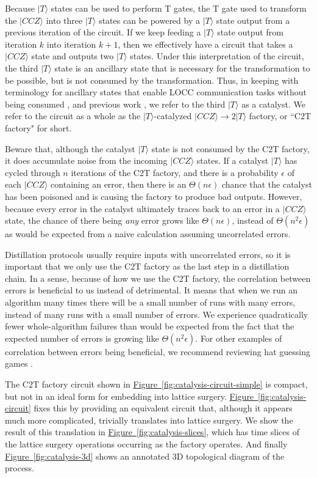 \documentclass[twocolumn,accepted=2019-03-30]{quantumarticle}
\newcommand{\fig}[1]{\hyperref[fig:#1]{Figure~\ref*{fig:#1}}}
\begin{document}
Because $|T\rangle$ states can be used to perform T gates, the T gate used to transform the $|CCZ\rangle$ into three $|T\rangle$ states can be powered by a $|T\rangle$ state output from a previous iteration of the circuit.
If we keep feeding a $|T\rangle$ state output from iteration $k$ into iteration $k+1$, then we effectively have a circuit that takes a $|CCZ\rangle$ state and outputs two $|T\rangle$ states.
Under this interpretation of the circuit, the third $|T\rangle$ state is an ancillary state that is necessary for the transformation to be possible, but is not consumed by the transformation.
Thus, in keeping with terminology for ancillary states that enable LOCC communication tasks without being consumed \cite{jonathan1999}, and previous work \cite{campbell2011catalysis}, we refer to the third $|T\rangle$ as a catalyst.
We refer to the circuit as a whole as the $|T\rangle$-catalyzed $|CCZ\rangle \rightarrow 2|T\rangle$ factory, or ``C2T factory" for short.

Beware that, although the catalyst $|T\rangle$ state is not consumed by the C2T factory, it does accumulate noise from the incoming $|CCZ\rangle$ states.
If a catalyst $|T\rangle$ has cycled through $n$ iterations of the C2T factory, and there is a probability $\epsilon$ of each $|CCZ\rangle$ containing an error, then there is an $\Theta(n \epsilon)$ chance that the catalyst has been poisoned and is causing the factory to produce bad outputs.
However, because every error in the catalyst ultimately traces back to an error in a $|CCZ\rangle$ state, the chance of there being {\em any} error grows like $\Theta(n \epsilon)$, instead of $\Theta(n^2 \epsilon)$ as would be expected from a naive calculation assuming uncorrelated errors.

Distillation protocols usually require inputs with uncorrelated errors, so it is important that we only use the C2T factory as the last step in a distillation chain.
In a sense, because of how we use the C2T factory, the correlation between errors is beneficial to us instead of detrimental.
It means that when we run an algorithm many times there will be a small number of runs with many errors, instead of many runs with a small number of errors.
We experience quadratically fewer whole-algorithm failures than would be expected from the fact that the expected number of errors is growing like $\Theta(n^2 \epsilon)$.
For other examples of correlation between errors being beneficial, we recommend reviewing hat guessing games \cite{paterson2010}.

The C2T factory circuit shown in \fig{catalysis-circuit-simple} is compact, but not in an ideal form for embedding into lattice surgery.
\fig{catalysis-circuit} fixes this by providing an equivalent circuit that, although it appears much more complicated, trivially translates into lattice surgery.
We show the result of this translation in \fig{catalysis-slices}, which has time slices of the lattice surgery operations occurring as the factory operates.
And finally \fig{catalysis-3d} shows an annotated 3D topological diagram of the process.
\end{document}
